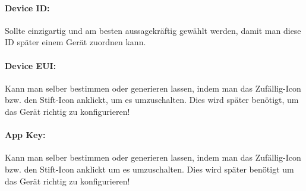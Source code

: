 \paragraph{Device ID:} Sollte einzigartig und am besten aussagekräftig gewählt werden, damit man diese ID später einem Gerät zuordnen kann.

\paragraph{Device EUI:} Kann man selber bestimmen oder generieren lassen, indem man das Zufällig-Icon bzw. den Stift-Icon anklickt, um es umzuschalten. Dies wird später benötigt, um das Gerät richtig zu konfigurieren!

\paragraph{App Key:} Kann man selber bestimmen oder generieren lassen, indem man das Zufällig-Icon bzw. den Stift-Icon anklickt um es umzuschalten. Dies wird später benötigt um das Gerät richtig zu konfigurieren!

